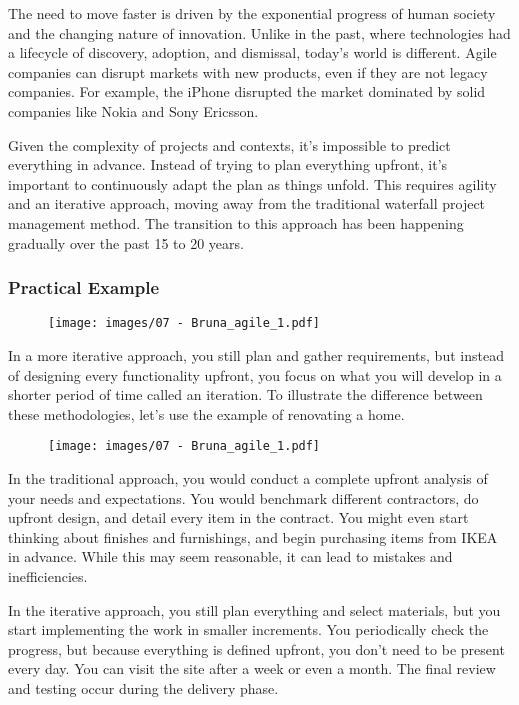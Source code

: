 The need to move faster is driven by the exponential progress of human
society and the changing nature of innovation. Unlike in the past, where
technologies had a lifecycle of discovery, adoption, and dismissal,
today's world is different. Agile companies can disrupt markets with new
products, even if they are not legacy companies. For example, the iPhone
disrupted the market dominated by solid companies like Nokia and Sony
Ericsson.

Given the complexity of projects and contexts, it's impossible to
predict everything in advance. Instead of trying to plan everything
upfront, it's important to continuously adapt the plan as things unfold.
This requires agility and an iterative approach, moving away from the
traditional waterfall project management method. The transition to this
approach has been happening gradually over the past 15 to 20 years.

\subsubsection{Practical Example}

\begin{figure}[!h]
  \centering
  \texttt{[image: images/07 - Bruna\_agile\_1.pdf]}
\end{figure}

In a more iterative approach, you still plan and gather requirements,
but instead of designing every functionality upfront, you focus on what
you will develop in a shorter period of time called an iteration. To
illustrate the difference between these methodologies, let's use the
example of renovating a home.

\begin{figure}[!h]
  \centering
  \texttt{[image: images/07 - Bruna\_agile\_1.pdf]}
\end{figure}

In the traditional approach, you would conduct a complete upfront
analysis of your needs and expectations. You would benchmark different
contractors, do upfront design, and detail every item in the contract.
You might even start thinking about finishes and furnishings, and begin
purchasing items from IKEA in advance. While this may seem reasonable,
it can lead to mistakes and inefficiencies.

In the iterative approach, you still plan everything and select
materials, but you start implementing the work in smaller increments.
You periodically check the progress, but because everything is defined
upfront, you don't need to be present every day. You can visit the site
after a week or even a month. The final review and testing occur during
the delivery phase.

